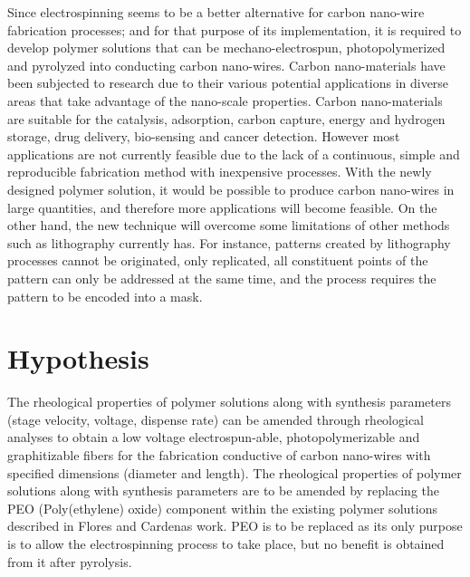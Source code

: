 Since electrospinning seems to be a better alternative for carbon nano-wire fabrication processes; and for that purpose of its implementation, it is required to develop polymer solutions that can be mechano-electrospun, photopolymerized and pyrolyzed into conducting carbon nano-wires. Carbon nano-materials have been subjected to research due to their various potential applications in diverse areas that take advantage of the nano-scale properties. \cite{Siddiqui2019} Carbon nano-materials are suitable for the catalysis, adsorption, carbon capture, energy and hydrogen storage, drug delivery, bio-sensing and cancer detection. \cite{Siddiqui2019} However most applications are not currently feasible due to the lack of a continuous, simple and reproducible fabrication method with inexpensive processes. With the newly designed polymer solution, it would be possible to produce carbon nano-wires in large quantities, and therefore more applications will become feasible. On the other hand, the new technique will overcome some limitations of other methods such as lithography currently has. For instance, patterns created by lithography processes cannot be originated, only replicated, all constituent points of the pattern can only be addressed at the same time, and the process requires the pattern to be encoded into a mask. \cite{Landis2011}



\section{Hypothesis}

The rheological properties of polymer solutions along with synthesis parameters (stage velocity, voltage, dispense rate) can be amended through rheological analyses to obtain a low voltage electrospun-able, photopolymerizable and graphitizable fibers for the fabrication conductive of carbon nano-wires with specified dimensions (diameter and length). The rheological properties of polymer solutions along with synthesis parameters are to be amended by replacing the PEO (Poly(ethylene) oxide) component within the existing polymer solutions described in Flores \cite{Flores2017} and Cardenas \cite{Cardenas2017} work. PEO is to be replaced as its only purpose is to allow the electrospinning process to take place, but no benefit is obtained from it after pyrolysis.

